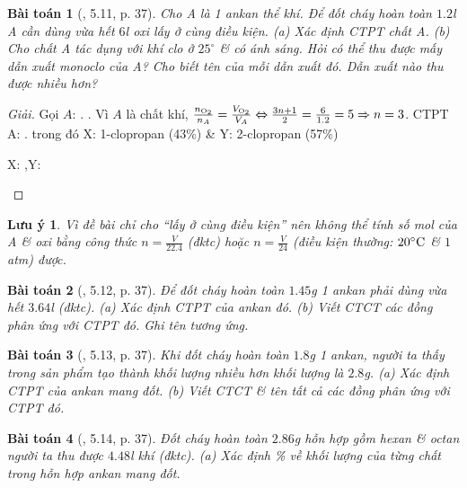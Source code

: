 \documentclass{article}
\newtheorem{baitoan}{Bài toán}
\newtheorem{luuy}{Lưu ý}
\begin{document}
\begin{baitoan}[\cite{SBT_Hoa_Hoc_11_co_ban}, 5.11, p. 37]
	Cho A là 1 ankan thể khí. Để đốt cháy hoàn toàn $1.2$\emph{l} A cần dùng vừa hết $6$\emph{l} oxi lấy ở cùng điều kiện. (a) Xác định CTPT chất A. (b) Cho chất A tác dụng với khí clo ở $25^\circ$ \& có ánh sáng. Hỏi có thể thu được mấy dẫn xuất monoclo của A? Cho biết tên của mỗi dẫn xuất đó. Dẫn xuất nào thu được nhiều hơn?
\end{baitoan}

\begin{proof}[Giải]
	Gọi $A$: . . Vì $A$ là chất khí, $\frac{n_{\ce{O2}}}{n_A} = \frac{V_{\ce{O2}}}{V_A}\Leftrightarrow\frac{3n + 1}{2} = \frac{6}{1.2} = 5\Rightarrow n = 3$. CTPT A: .  trong đó X: 1-clopropan (43\%) \& Y: 2-clopropan (57\%)
	\begin{center}
		X: ,\hspace{1cm}Y: 
	\end{center}
\end{proof}

\begin{luuy}
	Vì đề bài chỉ cho ``lấy ở cùng điều kiện'' nên không thể tính số mol của A \& oxi bằng công thức $n = \frac{V}{22.4}$ (đktc) hoặc $n = \frac{V}{24}$ (điều kiện thường: $20^\circ{\rm C}$ \& $1$\emph{atm}) được.
\end{luuy}

\begin{baitoan}[\cite{SBT_Hoa_Hoc_11_co_ban}, 5.12, p. 37]
	Để đốt cháy hoàn toàn $1.45$\emph{g} 1 ankan phải dùng vừa hết $3.64$\emph{l} \emph{} (đktc). (a) Xác định CTPT của ankan đó. (b) Viết CTCT các đồng phân ứng với CTPT đó. Ghi tên tương ứng.
\end{baitoan}

\begin{baitoan}[\cite{SBT_Hoa_Hoc_11_co_ban}, 5.13, p. 37]
	Khi đốt cháy hoàn toàn $1.8$\emph{g} 1 ankan, người ta thấy trong sản phẩm tạo thành khối lượng \emph{} nhiều hơn khối lượng \emph{} là $2.8$\emph{g}. (a) Xác định CTPT của ankan mang đốt. (b) Viết CTCT \& tên tất cả các đồng phân ứng với CTPT đó.
\end{baitoan}

\begin{baitoan}[\cite{SBT_Hoa_Hoc_11_co_ban}, 5.14, p. 37]
	Đốt cháy hoàn toàn $2.86$\emph{g} hỗn hợp gồm hexan \& octan người ta thu được $4.48$\emph{l} khí \emph{} (đktc). (a) Xác định \% về khối lượng của từng chất trong hỗn hợp ankan mang đốt.
\end{baitoan}
\end{document}
